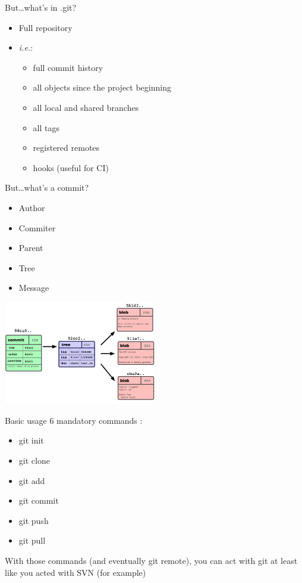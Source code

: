 \documentclass{beamer}
\begin{document}
\begin{frame}{But\dots what's in .git?}
\begin{itemize}
   \item Full repository\pause
   \item \emph{i.e.}:
      \begin{itemize}
         \item full commit history
         \item all objects since the project beginning
         \item all local and shared branches
         \item all tags
         \item registered remotes
         \item hooks (useful for CI)
      \end{itemize}
\end{itemize}
\end{frame}

\begin{frame}{But\dots what's a commit?}
   \begin{itemize}
      \item Author 
      \item Commiter 
      \item Parent 
      \item Tree 
      \item Message 
   \end{itemize}
 
   \begin{center}
      \includegraphics[width=0.5\textwidth]{commit-object.png}
   \end{center}
\end{frame}

\begin{frame}{Basic usage}
    6 mandatory commands : \\
    \begin{itemize}
        \item git init
        \item git clone
        \item git add
        \item git commit
        \item git push
        \item git pull
    \end{itemize}
    With those commands (and eventually git remote), you can act with git at least like you acted with SVN (for example)
\end{frame}
\end{document}
